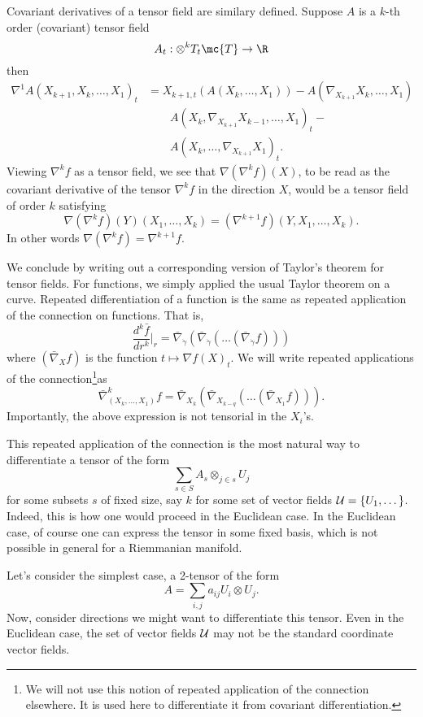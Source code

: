 \documentclass{article}
\begin{document}
Covariant derivatives of a tensor field are similary defined. Suppose $A$ is a $k$-th order (covariant) tensor field
$$
A_t:\otimes^k T_t\mc{T} \to \R
$$
then 
$$
\begin{aligned}
  \nabla^1 A(X_{k+1}, X_k, \dots, X_1)_t &= X_{k+1,t}(A(X_k, \dots, X_1)) - A(\nabla_{X_{k+1}}X_k, \dots, X_1)  \\
  &  \qquad  A(X_{k}, \nabla_{X_{k+1}}X_{k-1}, \dots, X_1)_t - \\
  & \qquad A(X_{k}, \dots, \nabla_{X_{k+1}}X_1)_t.
\end{aligned}
$$
Viewing $\nabla^{k} f$ as a tensor field, we see that $\nabla ( \nabla^k f)(X)$, to be read as the covariant derivative of the tensor $\nabla^k f$ in the direction
$X$, would be a tensor field of order $k$ satisfying
$$
\nabla(\nabla^k f)(Y)(X_1, \dots, X_k) = (\nabla^{k+1} f)(Y, X_1, \dots, X_k).
$$
In other words $\nabla (\nabla^k f) = \nabla^{k+1} f$.

We conclude by writing out a corresponding version of Taylor's theorem for tensor fields. For functions, we simply applied
the usual Taylor theorem on a curve. Repeated differentiation of a function is the same
as repeated application of the connection on functions. That is,
$$
\frac{d^k \bar{f}}{dr^k}\biggl|_r = \bar{\nabla}_{\dot{\gamma}} \left(\bar{\nabla}_{\dot{\gamma}}\left(\dots \left(\bar{\nabla}_{\dot{\gamma}}f\right) \right)\right)
$$
where $(\bar{\nabla}_{X}f)$ is  the function $t \mapsto \nabla f(X)_t$. We will write repeated applications of the connection\footnote{We will not use this notion
of repeated application of the connection elsewhere. It is used here to differentiate it from covariant differentiation.}as
$$
\bar{\nabla}^k_{(X_k, \dots, X_1)} f = \bar{\nabla}_{X_k}\left(\bar{\nabla}_{X_{k-q}} \left( \dots \left(\bar{\nabla}_{X_1}f\right)\right)\right).
$$
Importantly, the above expression is not tensorial in the $X_i$'s.

This repeated application of the connection is the most
natural way to differentiate a tensor of the form
$$
\sum_{s \in S} A_s \otimes_{j \in s} U_j
$$
for some subsets $s$ of fixed size, say $k$ for some set of vector fields ${\cal U} = \{U_1, \dots\}$. Indeed, this is how one would proceed in the Euclidean case. In the Euclidean case, of course one can express the tensor in some fixed basis, which is
not possible in general for a Riemmanian manifold.

Let's consider the simplest case, a 2-tensor of the form
$$
A = \sum_{i,j} a_{ij} U_i \otimes U_j.
$$
Now, consider directions we might want to differentiate this tensor. Even in the Euclidean case, the set of vector fields ${\cal U}$ may not be the standard
coordinate vector fields.
\end{document}
